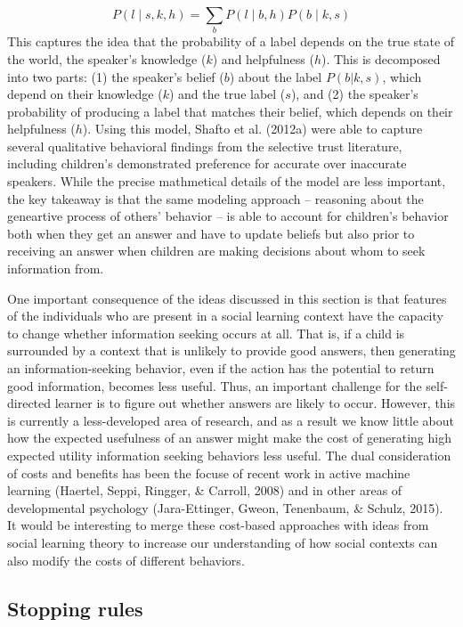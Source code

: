 \documentclass[english,floatsintext,man]{apa6}
\theoremstyle{definition}
\theoremstyle{definition}
\theoremstyle{definition}
\theoremstyle{remark}
\begin{document}
\[P(l \mid s,k,h) = \sum_b P(l \mid b,h)P(b \mid k,s)\] This captures
the idea that the probability of a label depends on the true state of
the world, the speaker's knowledge (\(k\)) and helpfulness (\(h\)). This
is decomposed into two parts: (1) the speaker's belief (\(b\)) about the
label \(P(b|k,s)\), which depend on their knowledge (\(k\)) and the true
label (\(s\)), and (2) the speaker's probability of producing a label
that matches their belief, which depends on their helpfulness (\(h\)).
Using this model, Shafto et al. (2012a) were able to capture several
qualitative behavioral findings from the selective trust literature,
including children's demonstrated preference for accurate over
inaccurate speakers. While the precise mathmetical details of the model
are less important, the key takeaway is that the same modeling approach
-- reasoning about the geneartive process of others' behavior -- is able
to account for children's behavior both when they get an answer and have
to update beliefs but also prior to receiving an answer when children
are making decisions about whom to seek information from.

One important consequence of the ideas discussed in this section is that
features of the individuals who are present in a social learning context
have the capacity to change whether information seeking occurs at all.
That is, if a child is surrounded by a context that is unlikely to
provide good answers, then generating an information-seeking behavior,
even if the action has the potential to return good information, becomes
less useful. Thus, an important challenge for the self-directed learner
is to figure out whether answers are likely to occur. However, this is
currently a less-developed area of research, and as a result we know
little about how the expected usefulness of an answer might make the
cost of generating high expected utility information seeking behaviors
less useful. The dual consideration of costs and benefits has been the
focuse of recent work in active machine learning (Haertel, Seppi,
Ringger, \& Carroll, 2008) and in other areas of developmental
psychology (Jara-Ettinger, Gweon, Tenenbaum, \& Schulz, 2015). It would
be interesting to merge these cost-based approaches with ideas from
social learning theory to increase our understanding of how social
contexts can also modify the costs of different behaviors.

\subsection{Stopping rules}\label{stopping-rules}
\end{document}
